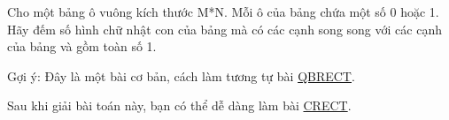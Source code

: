 Cho một bảng ô vuông kích thước M*N. Mỗi ô của bảng chứa một số 0 hoặc 1. Hãy đếm số hình chữ nhật con của bảng mà có các cạnh song song với các cạnh của bảng và gồm toàn số 1.

Gợi ý: Đây là một bài cơ bản, cách làm tương tự bài \href{http://vnoi.info/problems/show/QBRECT/}{ QBRECT}.

Sau khi giải bài toán này, bạn có thể dễ dàng làm bài \href{http://vnoi.info/problems/show/CRECT/}{ CRECT}.
